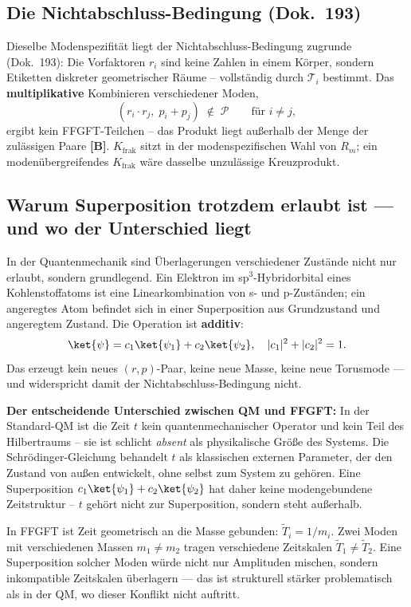 \subsection{Die Nichtabschluss-Bedingung (Dok.~193)}

Dieselbe Modenspezifität liegt der Nichtabschluss-Bedingung zugrunde
(Dok.~193): Die Vorfaktoren $r_i$ sind keine Zahlen in einem Körper,
sondern Etiketten diskreter geometrischer Räume -- vollständig durch
$\mathcal{T}_i$ bestimmt. Das \textbf{multiplikative} Kombinieren
verschiedener Moden,
\[
  (r_i\cdot r_j,\; p_i+p_j) \;\notin\; \mathcal{P}
  \qquad\text{für }i\neq j,
\]
ergibt kein FFGFT-Teilchen -- das Produkt liegt außerhalb der Menge
der zulässigen Paare \textbf{[B]}. $K_{\text{frak}}$ sitzt in der
modenspezifischen Wahl von $R_m$; ein modenübergreifendes
$K_{\text{frak}}$ wäre dasselbe unzulässige Kreuzprodukt.

\subsection{Warum Superposition trotzdem erlaubt ist — und wo der Unterschied liegt}

In der Quantenmechanik sind Überlagerungen verschiedener Zustände
nicht nur erlaubt, sondern grundlegend. Ein Elektron im
sp$^3$-Hybridorbital eines Kohlenstoffatoms ist eine
Linearkombination von s- und p-Zuständen; ein angeregtes Atom
befindet sich in einer Superposition aus Grundzustand und angeregtem
Zustand. Die Operation ist \textbf{additiv}:
\[
  \ket{\psi} = c_1\ket{\psi_1} + c_2\ket{\psi_2},
  \quad |c_1|^2 + |c_2|^2 = 1.
\]
Das erzeugt kein neues $(r,p)$-Paar, keine neue Masse, keine neue
Torusmode — und widerspricht damit der Nichtabschluss-Bedingung
nicht.

\textbf{Der entscheidende Unterschied zwischen QM und FFGFT:}
In der Standard-QM ist die Zeit $t$ kein quantenmechanischer
Operator und kein Teil des Hilbertraums -- sie ist schlicht
\emph{absent} als physikalische Größe des Systems. Die
Schrödinger-Gleichung behandelt $t$ als klassischen externen
Parameter, der den Zustand von außen entwickelt, ohne selbst
zum System zu gehören. Eine Superposition
$c_1\ket{\psi_1}+c_2\ket{\psi_2}$ hat daher keine
modengebundene Zeitstruktur -- $t$ gehört nicht zur
Superposition, sondern steht außerhalb.

In FFGFT ist Zeit geometrisch an die Masse gebunden:
$\tilde{T}_i = 1/m_i$. Zwei Moden mit verschiedenen Massen
$m_1\neq m_2$ tragen verschiedene Zeitskalen
$\tilde{T}_1\neq\tilde{T}_2$. Eine Superposition solcher Moden
würde nicht nur Amplituden mischen, sondern inkompatible
Zeitskalen überlagern — das ist strukturell stärker problematisch
als in der QM, wo dieser Konflikt nicht auftritt.

